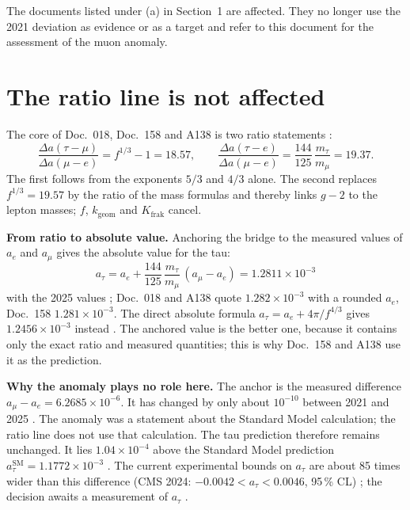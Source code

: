 The documents listed under (a) in Section~1 are affected. They no longer use the 2021
deviation as evidence or as a target and refer to this document for the assessment of
the muon anomaly.

\section{The ratio line is not affected}
The core of Doc.~018, Doc.~158 and A138 is two ratio statements \KM:
\[
  \frac{\Delta a(\tau{-}\mu)}{\Delta a(\mu{-}e)} = f^{1/3}-1 = 18.57,
  \qquad
  \frac{\Delta a(\tau{-}e)}{\Delta a(\mu{-}e)} = \frac{144}{125}\,\frac{m_\tau}{m_\mu} = 19.37 .
\]
The first follows from the exponents $5/3$ and $4/3$ alone. The second replaces
$f^{1/3}=19.57$ by the ratio of the mass formulas and thereby links $g-2$ to the lepton
masses; $f$, $k_\mathrm{geom}$ and $K_\mathrm{frak}$ cancel.

\textbf{From ratio to absolute value.} Anchoring the bridge to the measured values of
$a_e$ and $a_\mu$ gives the absolute value for the tau:
\[
  a_\tau = a_e + \frac{144}{125}\,\frac{m_\tau}{m_\mu}\,(a_\mu-a_e) = 1.2811\times10^{-3}
\]
with the 2025 values \KM; Doc.~018 and A138 quote $1.282\times10^{-3}$ with a rounded
$a_e$, Doc.~158 $1.281\times10^{-3}$. The direct absolute formula
$a_\tau=a_e+4\pi/f^{4/3}$ gives $1.2456\times10^{-3}$ instead \KM. The anchored value is
the better one, because it contains only the exact ratio and measured quantities; this
is why Doc.~158 and A138 use it as the prediction.

\textbf{Why the anomaly plays no role here.} The anchor is the measured difference
$a_\mu-a_e=6.2685\times10^{-6}$. It has changed by only about $10^{-10}$ between 2021 and
2025 \KM. The anomaly was a statement about the Standard Model calculation; the ratio
line does not use that calculation. The tau prediction therefore remains unchanged. It
lies $1.04\times10^{-4}$ above the Standard Model prediction
$a_\tau^{\mathrm{SM}}=1.1772\times10^{-3}$ \KM. The current experimental bounds on
$a_\tau$ are about 85 times wider than this difference (CMS 2024: $-0.0042 < a_\tau < 0.0046$, 95\,\% CL) \KM; the decision awaits a
measurement of $a_\tau$ \SM.

